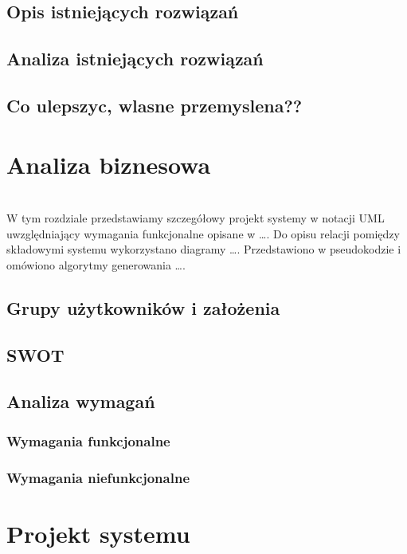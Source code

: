 \documentclass[10pt,titlepage]{article}
\newcommand{\PRZYKLAD}[1]{\par \noindent{\color{blue}PRZYKŁAD:}\\ {\color{szary}#1}\par}
\newcounter{subsubsubsection}[subsubsection]
\begin{document}
\subsection{Opis istniejących rozwiązań}
\subsection{Analiza istniejących rozwiązań}
\subsection{Co ulepszyc, wlasne przemyslena??}



\section{Analiza biznesowa}

\PRZYKLAD{W tym rozdziale przedstawiamy szczegółowy projekt systemy w notacji UML 
uwzględniający wymagania funkcjonalne opisane w \ldots. 
Do opisu relacji pomiędzy składowymi systemu wykorzystano diagramy \ldots.
Przedstawiono w pseudokodzie i omówiono algorytmy generowania \ldots.}

\subsection{Grupy użytkowników i założenia}
\subsection{SWOT}
\subsection{Analiza wymagań}
\subsubsection{Wymagania funkcjonalne}
\subsubsection{Wymagania niefunkcjonalne}

\section{Projekt systemu}
\end{document}
